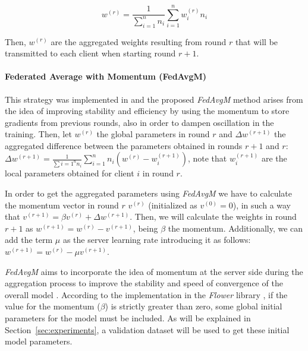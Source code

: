 \documentclass[5p,times]{elsarticle}
\begin{document}
\begin{equation}\label{eq:fedavg}
    w^{(r)} = \frac{1}{\sum_{i=1}^{n}n_{i}}\sum_{i=1}^{n}w_{i}^{(r)}n_{i}
\end{equation}

Then, $w^{(r)}$ are the aggregated weights resulting from round $r$ that will be transmitted to each client when starting round $r+1$. 

\paragraph{Federated Average with Momentum (FedAvgM)}

This strategy was implemented in \cite{fedavgm} and the proposed \textit{FedAvgM} method arises from the idea of improving stability and efficiency by using the momentum to store gradients from previous rounds, also in order to dampen oscillation in the training. Then, let $w^{(r)}$ the global parameters in round $r$ and $\Delta w^{(r+1)}$ the aggregated difference between the parameters obtained in rounds $r+1$ and $r$: $\Delta w^{(r+1)}=\frac{1}{\sum{i=1}^{n}n_{i}}\sum_{i=1}^{n} n_{i}(w^{(r)}-w_{i}^{(r+1)})$, note that $w_{i}^{(r+1)}$ are the local parameters obtained for client $i$ in round $r$.

In order to get the aggregated parameters using \textit{FedAvgM} we have to calculate the momentum vector in round $r$ $v^{(r)}$ (initialized as $v^{(0)}=0$), in such a way that $v^{(r+1)}=\beta v^{(r)} + \Delta w^{(r+1)}$. Then, we will calculate the weights in round $r+1$ as $w^{(r+1)}=w^{(r)}-v^{(r+1)}$, being $\beta$ the momentum. %
Additionally, we can add the term $\mu$ as the server learning rate introducing it as follows: $w^{(r+1)}=w^{(r)}-\mu v^{(r+1)}$.

\textit{FedAvgM} aims to incorporate the idea of momentum at the server side during the aggregation process to improve the stability and speed of convergence of the overall model \cite{fedavgm}. According to the implementation in the \textit{Flower} library \cite{beutel2020flower}, if the value for the momentum ($\beta$) is strictly greater than zero, some global initial parameters for the model must be included. As will be explained in Section~\ref{sec:experiments}, a validation dataset will be used to get these initial model parameters.
\end{document}
